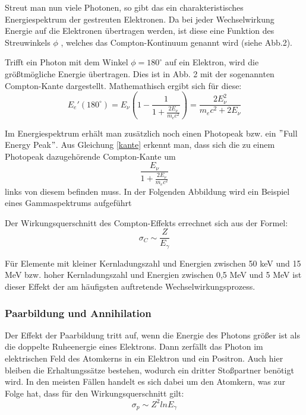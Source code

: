 Streut man nun viele Photonen, so gibt das ein charakteristisches Energiespektrum der gestreuten Elektronen. Da bei jeder Wechselwirkung Energie auf die Elektronen übertragen werden, ist diese eine Funktion des Streuwinkels $\phi$ , welches das Compton-Kontinuum genannt wird (siehe Abb.2).


Trifft ein Photon mit dem Winkel $\phi = 180^{\circ}$ auf ein Elektron, wird die größtmögliche Energie übertragen. Dies ist in Abb. 2 mit der sogenannten Compton-Kante dargestellt. Mathemathisch ergibt sich für diese:
	\begin{equation}
	\label{kante}
	E_{e}'(180^{\circ}) = E_{\nu} \left(1-\frac{1}{1+\frac{2E_{\nu}}{m_{e}c^{2}}}\right) = \frac{2E_{\nu}^{2}}{m_{e}c^{2} +2E_{\nu}}
	\end{equation}

Im Energiespektrum erhält man zusätzlich noch einen Photopeak bzw. ein $"$Full Energy Peak$"$. Aus Gleichung \eqref{kante} erkennt man, dass sich die zu einem Photopeak dazugehörende Compton-Kante um 
	\begin{equation}
	\frac{E_{\nu}}{1+\frac{2E_{\nu}}{m_{e}c^{2}}}
	\end{equation}
links von diesem befinden muss. In der Folgenden Abbildung wird ein Beispiel eines Gammaspektrums aufgeführt\\


Der Wirkungsquerschnitt des Compton-Effekts errechnet sich aus der Formel:
	\begin{equation}
	\sigma_{C} \sim \frac{Z}{E_{\gamma}}
	\end{equation}
	
Für Elemente mit kleiner Kernladungszahl und Energien zwischen 50 keV und 15 MeV bzw. hoher Kernladungszahl und Energien zwischen 0,5 MeV und 5 MeV ist dieser Effekt der am häufigsten auftretende Wechselwirkungsprozess.

	\subsubsection*{Paarbildung und Annihilation}
	Der Effekt der Paarbildung tritt auf, wenn die Energie des Photons größer ist als die doppelte Ruheenergie eines Elektrons. Dann zerfällt das Photon im elektrischen Feld des Atomkerns in ein Elektron und ein Positron. Auch hier bleiben die Erhaltungssätze bestehen, wodurch ein dritter Stoßpartner benötigt wird. In den meisten Fällen handelt es sich dabei um den Atomkern, was zur Folge hat, dass für den Wirkungsquerschnitt gilt:
	\begin{equation}
	\sigma_{p} \sim Z^{2} ln E_{\gamma}
	\end{equation}

